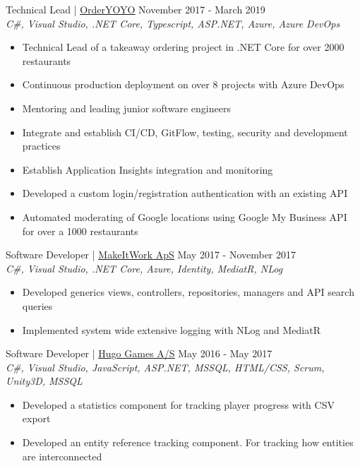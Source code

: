 \documentclass[margin, 10pt, hidelinks]{res} %
\newcommand{\emphasize}{\large} %
\begin{document}
\begin{resume}
{\emphasize Technical Lead} | \href{https://orderyoyo.com/}{\underline{OrderYOYO}}    \hfill November 2017 - March 2019  \\
{\it C\#, Visual Studio, .NET Core, Typescript, ASP.NET, Azure, Azure DevOps} %
\begin{itemize} \setlength{\itemindent}{-0.1in}\itemsep 0pt %
\item Technical Lead of a takeaway ordering project in .NET Core for over 2000 restaurants
\item Continuous production deployment on over 8 projects with Azure DevOps
\item Mentoring and leading junior software engineers
\item Integrate and establish  CI/CD, GitFlow, testing, security and development practices
\item Establish Application Insights integration and monitoring
\item Developed a custom login/registration authentication with an existing API
\item Automated moderating of Google locations using Google My Business API for over a 1000 restaurants
\end{itemize}

{\emphasize Software Developer} | \href{http://www.makeitwork.dk}{\underline{MakeItWork ApS}}  \hfill May 2017 - November 2017  \\
{\it C\#, Visual Studio, .NET Core, Azure, Identity, MediatR, NLog  } %
\begin{itemize} \setlength{\itemindent}{-0.1in}\itemsep 0pt %
\item Developed generics views, controllers, repositories, managers and API search queries
\item Implemented system wide extensive logging with NLog and MediatR
\end{itemize}

{\emphasize Software Developer} | \href{https://www.hugogames.com}{\underline{Hugo Games A/S}}   \hfill May 2016 - May 2017  \\
{\it C\#, Visual Studio, JavaScript, ASP.NET, MSSQL, HTML/CSS, Scrum, Unity3D, MSSQL} %
\begin{itemize} \setlength{\itemindent}{-0.1in}\itemsep 0pt %
\item Developed a statistics component for tracking player progress with CSV export
\item Developed an entity reference tracking component. For tracking how entities are interconnected
\end{itemize}


\end{resume}
\end{document}
